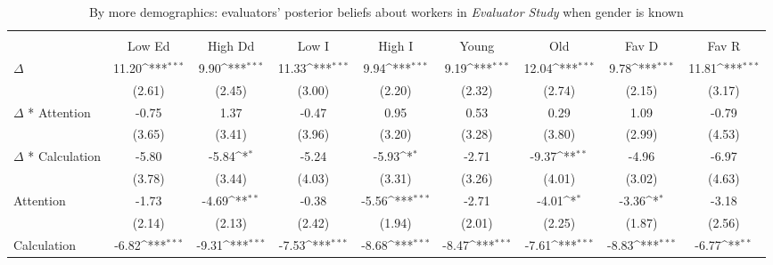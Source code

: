 \begin{table}[htbp]\centering
\def\sym#1{\ifmmode^{#1}\else\(^{#1}\)\fi}
\caption{By more demographics: evaluators' posterior beliefs about workers in \textit{Evaluator Study} when gender is known}
\begin{tabular}{l*{8}{c}}
\hline\hline
                &\multicolumn{8}{c}{}                                                                                                                                   \\\cmidrule(lr){2-9}
                &\multicolumn{1}{c}{Low Ed}&\multicolumn{1}{c}{High Dd}&\multicolumn{1}{c}{Low I}&\multicolumn{1}{c}{High I}&\multicolumn{1}{c}{Young}&\multicolumn{1}{c}{Old}&\multicolumn{1}{c}{Fav D}&\multicolumn{1}{c}{Fav R}\\
\hline
$\Delta$        &    11.20\sym{***}&     9.90\sym{***}&    11.33\sym{***}&     9.94\sym{***}&     9.19\sym{***}&    12.04\sym{***}&     9.78\sym{***}&    11.81\sym{***}\\
                &   (2.61)         &   (2.45)         &   (3.00)         &   (2.20)         &   (2.32)         &   (2.74)         &   (2.15)         &   (3.17)         \\
$\Delta$ * Attention&    -0.75         &     1.37         &    -0.47         &     0.95         &     0.53         &     0.29         &     1.09         &    -0.79         \\
                &   (3.65)         &   (3.41)         &   (3.96)         &   (3.20)         &   (3.28)         &   (3.80)         &   (2.99)         &   (4.53)         \\
$\Delta$ * Calculation&    -5.80         &    -5.84\sym{*}  &    -5.24         &    -5.93\sym{*}  &    -2.71         &    -9.37\sym{**} &    -4.96         &    -6.97         \\
                &   (3.78)         &   (3.44)         &   (4.03)         &   (3.31)         &   (3.26)         &   (4.01)         &   (3.02)         &   (4.63)         \\
Attention       &    -1.73         &    -4.69\sym{**} &    -0.38         &    -5.56\sym{***}&    -2.71         &    -4.01\sym{*}  &    -3.36\sym{*}  &    -3.18         \\
                &   (2.14)         &   (2.13)         &   (2.42)         &   (1.94)         &   (2.01)         &   (2.25)         &   (1.87)         &   (2.56)         \\
Calculation     &    -6.82\sym{***}&    -9.31\sym{***}&    -7.53\sym{***}&    -8.68\sym{***}&    -8.47\sym{***}&    -7.61\sym{***}&    -8.83\sym{***}&    -6.77\sym{**} \\

\end{tabular}
\end{table}
